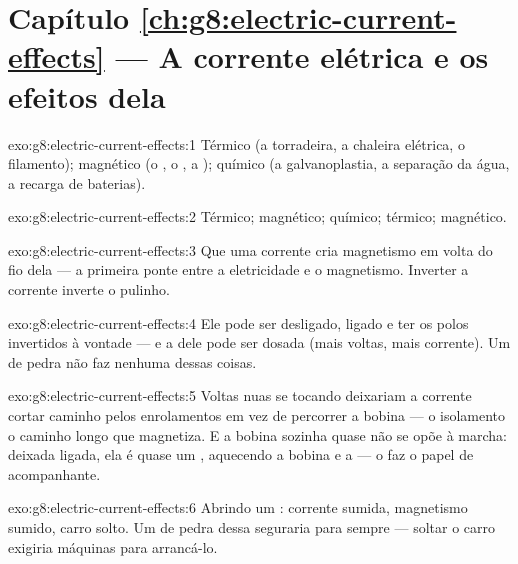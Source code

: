 \section*{Capítulo \ref{ch:g8:electric-current-effects} --- A corrente elétrica e os efeitos dela}

\begin{solution}{exo:g8:electric-current-effects:1}
Térmico (a torradeira, a chaleira elétrica, o filamento); magnético
(o , o , a ); químico (a galvanoplastia, a
separação da água, a recarga de baterias).
\end{solution}

\begin{solution}{exo:g8:electric-current-effects:2}
Térmico; magnético; químico; térmico; magnético.
\end{solution}

\begin{solution}{exo:g8:electric-current-effects:3}
Que uma corrente cria magnetismo em volta do fio dela --- a primeira
ponte entre a eletricidade e o magnetismo. Inverter a corrente
inverte o pulinho.
\end{solution}

\begin{solution}{exo:g8:electric-current-effects:4}
Ele pode ser desligado, ligado e ter os polos invertidos à vontade
--- e a  dele pode ser dosada (mais voltas, mais corrente). Um
 de pedra não faz nenhuma dessas coisas.
\end{solution}

\begin{solution}{exo:g8:electric-current-effects:5}
Voltas nuas se tocando deixariam a corrente cortar caminho pelos
enrolamentos em vez de percorrer a bobina --- o isolamento  o
caminho longo que magnetiza. E a bobina sozinha quase não se opõe à
marcha: deixada ligada, ela é quase um , aquecendo a
bobina e a  --- o  faz o papel de acompanhante.
\end{solution}

\begin{solution}{exo:g8:electric-current-effects:6}
Abrindo um : corrente sumida, magnetismo sumido, carro
solto. Um  de pedra dessa  seguraria para sempre --- soltar o
carro exigiria máquinas para arrancá-lo.
\end{solution}


